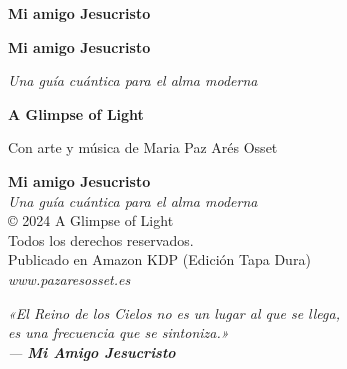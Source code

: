 \documentclass[12pt,twoside,openright]{book}
\begin{document}
\frontmatter

\thispagestyle{empty}
\vspace*{5cm}
\begin{center}
    {\LARGE \textbf{Mi amigo Jesucristo}}
\end{center}
\cleardoublepage

\begin{titlepage}
    \centering
    \vspace*{2cm}
    {\Huge \textbf{Mi amigo Jesucristo} \par}
    \vspace{0.8cm}
    {\Large \textit{Una guía cuántica para el alma moderna} \par}
    \vfill
    {\large \textbf{A Glimpse of Light} \par}
    \vspace{0.5cm}
    {\small Con arte y música de Maria Paz Arés Osset \par}
    \vspace*{2cm}
\end{titlepage}
\cleardoublepage

\thispagestyle{empty}
\vspace*{11cm}
\begin{center}
    \small
    \textbf{Mi amigo Jesucristo} \\
    \textit{Una guía cuántica para el alma moderna} \\
    \vspace{0.5cm}
    © 2024 A Glimpse of Light \\
    Todos los derechos reservados. \\
    Publicado en Amazon KDP (Edición Tapa Dura) \\
    \vspace{0.3cm}
    \textit{www.pazaresosset.es}
\end{center}
\cleardoublepage

\thispagestyle{empty}
\vspace*{6cm}
\begin{center}
    \itshape
    «El Reino de los Cielos no es un lugar al que se llega,\\
    es una frecuencia que se sintoniza.»\\
    \vspace{1cm}
    \normalfont --- \textbf{Mi Amigo Jesucristo}
\end{center}
\cleardoublepage
\end{document}
